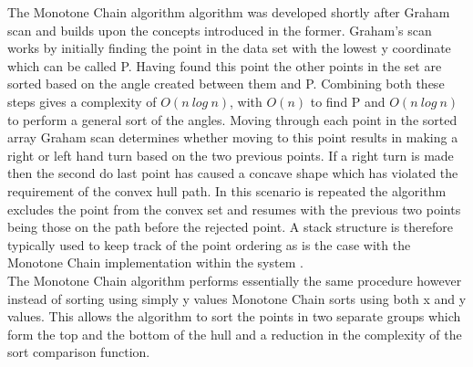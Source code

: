 \noindent
The Monotone Chain algorithm algorithm was developed shortly after Graham scan and builds upon the concepts introduced in the former. Graham's scan works by initially finding the point in the data set with the lowest y coordinate which can be called P. Having found this point the other points in the set are sorted based on the angle created between them and P. Combining both these steps gives a complexity of $O(n\ log\ n)$, with  $O(n)$ to find P and $O(n\ log\ n)$ to perform a general sort of the angles. Moving through each point in the sorted array Graham scan determines whether moving to this point results in making a right or left hand turn based on the two previous points. If a right turn is made then the second do last point has caused a concave shape which has violated the requirement of the convex hull path. In this scenario is repeated the algorithm excludes the point from the convex set and resumes with the previous two points being those on the path before the rejected point. A stack structure is therefore typically used to keep track of the point ordering as is the case with the Monotone Chain implementation within the system \cite{ChainHull}. \\ 

\noindent
The Monotone Chain algorithm performs essentially the same procedure however instead of sorting using simply y values Monotone Chain sorts using both x and y values. This allows the algorithm to sort the points in two separate groups which form the top and the bottom of the hull and a reduction in the complexity of the sort comparison function. \\ \\ 

